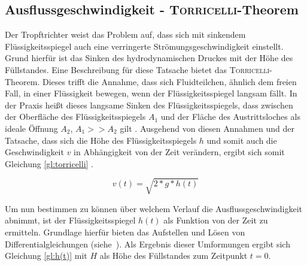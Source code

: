 \subsection{Ausflussgeschwindigkeit - \textsc{Torricelli}-Theorem}
\label{sec:torricelli}
Der Tropftrichter weist das Problem auf, dass sich mit sinkendem Flüssigkeitsspiegel auch eine verringerte Strömungsgeschwindigkeit einstellt. Grund hierfür ist das Sinken des hydrodynamischen Druckes mit der Höhe des Füllstandes. 
Eine Beschreibung für diese Tatsache bietet das \textsc{Torricelli}-Theorem. Dieses trifft die Annahme, dass sich Fluidteilchen, ähnlich dem freien Fall, in einer Flüssigkeit bewegen, wenn der Flüssigkeitsspiegel langsam fällt. In der Praxis heißt dieses langsame Sinken des Flüssigkeitsspiegels, dass zwischen der Oberfläche des Flüssigkeitsspiegels $A_1$ und der Fläche des Austrittsloches als ideale Öffnung $A_2$, $A_1>>A_2$ gilt \cite{Kurzweil.2008}. Ausgehend von diesen Annahmen und der Tatsache, dass sich die Höhe des Flüssigkeitsspiegels $h$ und somit auch die Geschwindigkeit $v$ in Abhängigkeit von der Zeit verändern, ergibt sich somit Gleichung \eqref{gl:torricelli} \cite{tecscience.2019}.

\begin{equation}
\label{gl:torricelli}
	v(t) = \sqrt{2*g*h(t)}
\end{equation}




Um nun bestimmen zu können über welchem Verlauf die Ausflussgeschwindigkeit abnimmt, ist der Flüssigkeitsspiegel $h(t)$ als Funktion von der Zeit zu ermitteln. Grundlage hierfür bieten das Aufstellen und Lösen von Differentialgleichungen
\mbox{(siehe \cite{tecscience.2019})}. Als Ergebnis dieser Umformungen ergibt sich Gleichung \eqref{gl:h(t)} mit $H$ als Höhe des Füllstandes zum Zeitpunkt $t=0$.

